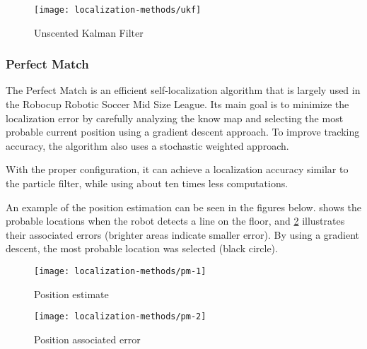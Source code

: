 \begin{figure}[H]
	\centering
	\texttt{[image: localization-methods/ukf]}
	\caption[Unscented Kalman Filter]{Unscented Kalman Filter\protect\footnotemark}
	\label{fig:localization-methods_ukf}
\end{figure}


\subsubsection{Perfect Match}

The Perfect Match \cite{Lauer2006a,Pinto1963} is an efficient self-localization algorithm that is largely used in the Robocup Robotic Soccer Mid Size League. Its main goal is to minimize the localization error by carefully analyzing the know map and selecting the most probable current position using a gradient descent approach. To improve tracking accuracy, the algorithm also uses a stochastic weighted approach.

With the proper configuration, it can achieve a localization accuracy similar to the particle filter, while using about ten times less computations.

An example of the position estimation can be seen in the figures below.  shows the probable locations when the robot detects a line on the floor, and \cref{fig:localization-methods_pm-2} illustrates their associated errors (brighter areas indicate smaller error). By using a gradient descent, the most probable location was selected (black circle).

\begin{figure}[H]
	\centering
	\begin{minipage}[h]{.495\textwidth}
		\centering
		\texttt{[image: localization-methods/pm-1]}
		\caption{Position estimate}
		\label{fig:localization-methods_pm-1}
	\end{minipage}\hfill
	\begin{minipage}[h]{.495\textwidth}
		\centering
		\texttt{[image: localization-methods/pm-2]}
		\caption{Position associated error}
		\label{fig:localization-methods_pm-2}
	\end{minipage}
\end{figure}


\subsection{}

